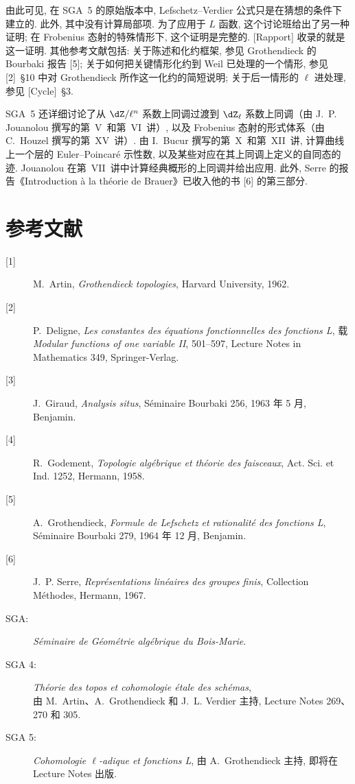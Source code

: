 由此可见, 在 SGA~5 的原始版本中, Lefschetz--\allowbreak Verdier 公式只是在猜想的条件下建立的. 此外, 其中没有计算局部项. 为了应用于 $L$ 函数, 这个讨论班给出了另一种证明; 在 Frobenius 态射的特殊情形下, 这个证明是完整的. [Rapport] 收录的就是这一证明. 其他参考文献包括: 关于陈述和化约框架, 参见 Grothendieck 的 Bourbaki 报告 [5]; 关于如何把关键情形化约到 Weil 已处理的一个情形, 参见 [2]~\S10 中对 Grothendieck 所作这一化约的简短说明; 关于后一情形的 $\ell$ 进处理, 参见 [Cycle]~\S3.

SGA~5 还详细讨论了从 $\dZ/\ell^n$ 系数上同调过渡到 $\dZ_\ell$ 系数上同调（由 J.~P. Jouanolou 撰写的第~V~和第~VI~讲）, 以及 Frobenius 态射的形式体系（由 C.~Houzel 撰写的第~XV~讲）. 由 I.~Bucur 撰写的第~X~和第~XII~讲, 计算曲线上一个层的 Euler--Poincaré 示性数, 以及某些对应在其上同调上定义的自同态的迹. Jouanolou 在第~VII~讲中计算经典概形的上同调并给出应用. 此外, Serre 的报告《Introduction à la théorie de Brauer》已收入他的书 [6] 的第三部分.

\section*{参考文献}
\begin{description}
\item[{[1]}] M.~Artin, \emph{Grothendieck topologies}, Harvard University, 1962.
\item[{[2]}] P.~Deligne, \emph{Les constantes des équations fonctionnelles des fonctions L}, 载 \emph{Modular functions of one variable II}, 501--597, Lecture Notes in Mathematics 349, Springer-Verlag.
\item[{[3]}] J.~Giraud, \emph{Analysis situs}, Séminaire Bourbaki 256, 1963 年 5 月, Benjamin.
\item[{[4]}] R.~Godement, \emph{Topologie algébrique et théorie des faisceaux}, Act. Sci. et Ind. 1252, Hermann, 1958.
\item[{[5]}] A.~Grothendieck, \emph{Formule de Lefschetz et rationalité des fonctions L}, Séminaire Bourbaki 279, 1964 年 12 月, Benjamin.
\item[{[6]}] J.~P. Serre, \emph{Représentations linéaires des groupes finis}, Collection Méthodes, Hermann, 1967.
\end{description}
\begin{description}
\item[SGA:] \emph{Séminaire de Géométrie algébrique du Bois-Marie}.
\item[SGA 4:] \emph{Théorie des topos et cohomologie étale des schémas},\\
由 M.~Artin、A.~Grothendieck 和 J.~L. Verdier 主持, Lecture Notes 269、270 和 305.
\item[SGA 5:] \emph{Cohomologie $\ell$-adique et fonctions L}, 由 A.~Grothendieck 主持, 即将在 Lecture Notes 出版.
\end{description}

